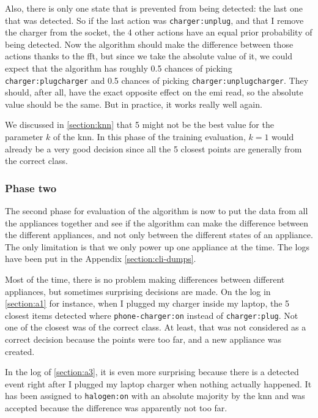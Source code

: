 Also, there is only one state that is prevented from being detected: the last one that was detected. So if the last action was \texttt{charger:unplug}, and that I remove the charger from the socket, the 4 other actions have an equal prior probability of being detected. Now the algorithm should make the difference between those actions thanks to the \acrshort{fft}, but since we take the absolute value of it, we could expect that the algorithm has roughly 0.5 chances of picking \texttt{charger:plugcharger} and 0.5 chances of picking \texttt{charger:unplugcharger}. They should, after all, have the exact opposite effect on the \acrshort{emi} read, so the absolute value should be the same. But in practice, it works really well again.

We discussed in \autoref{section:knn} that 5 might not be the best value for the parameter $k$ of the \acrshort{knn}. In this phase of the training evaluation, $k=1$ would already be a very good decision since all the 5 closest points are generally from the correct class.

\subsubsection{Phase two}
The second phase for evaluation of the algorithm is now to put the data from all the appliances together and see if the algorithm can make the difference between the different appliances, and not only between the different states of an appliance. The only limitation is that we only power up one appliance at the time. The logs have been put in the Appendix \ref{section:cli-dumps}.

Most of the time, there is no problem making differences between different appliances, but sometimes surprising decisions are made. On the log in \autoref{section:a1} for instance, when I plugged my charger inside my laptop, the 5 closest items detected where \texttt{phone-charger:on} instead of \texttt{charger:plug}. Not one of the closest was of the correct class. At least, that was not considered as a correct decision because the points were too far, and a new appliance was created. 

In the log of \autoref{section:a3}, it is even more surprising because there is a detected event right after I plugged my laptop charger when nothing actually happened. It has been assigned to \texttt{halogen:on} with an absolute majority by the \acrshort{knn} and was accepted because the difference was apparently not too far.


